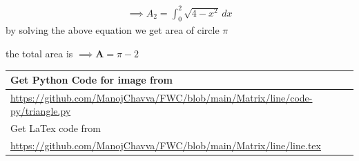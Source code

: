 \documentclass[journal,12pt,twocolumn]{IEEEtran}
\let\vec\mathbf
\begin{document}
\begin{align} 
\implies A_2=\int_{0}^{2}\sqrt{4-x^2} \,dx 
\end{align}
by solving the above equation we get area of circle $\pi$

the total area is
$\implies \vec{A}=\pi - 2$


\begin{table}[h]
\large
\begin{tabular}{lll}
\multicolumn{3}{l}{Get Python Code for image from}                                                 \\ \hline
\multicolumn{3}{|l|}{\url{https://github.com/ManojChavva/FWC/blob/main/Matrix/line/code-py/triangle.py}} \\ 
 \hline
\multicolumn{3}{l}{Get LaTex code from}                                                            \\ \hline
\multicolumn{3}{|l|}{\url{https://github.com/ManojChavva/FWC/blob/main/Matrix/line/line.tex}}            \\ \hline
\end{tabular}
\end{table}
\end{document}
